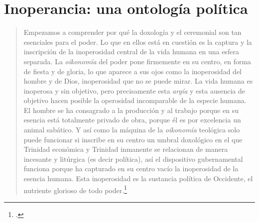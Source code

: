 \section{Inoperancia: una ontología política} %

\begin{quote}
Empezamos a comprender por qué la doxología y el ceremonial son tan esenciales para el poder. Lo que en ellos está en cuestión es la captura y la inscripción de la inoperosidad central de la vida humana en una esfera separada. La \emph{oikonomía} del poder pone firmemente en su centro, en forma de fiesta y de gloria, lo que aparece a sus ojos como la inoperosidad del hombre y de Dios, inoperosidad que no se puede mirar. La vida humana es inoperosa y sin objetivo, pero precisamente esta \emph{argía} y esta ausencia de objetivo hacen posible la operosidad incomparable de la especie humana. El hombre se ha consagrado a la producción y al trabajo porque en su esencia está totalmente privado de obra, porque él es por excelencia un animal sabático. Y así como la máquina de la \emph{oikonomía} teológica solo puede funcionar si inscribe en su centro un umbral doxológico en el que Trinidad económica y Trinidad inmanente se relacionan de manera incesante y litúrgica (es decir política), así el dispositivo gubernamental funciona porque ha capturado en su centro vacío la inoperosidad de la esencia humana. Esta inoperosidad es la sustancia política de Occidente, el nutriente glorioso de todo poder.\footcite[428--429]{@7102-AGAMBEN2008}
\end{quote}

